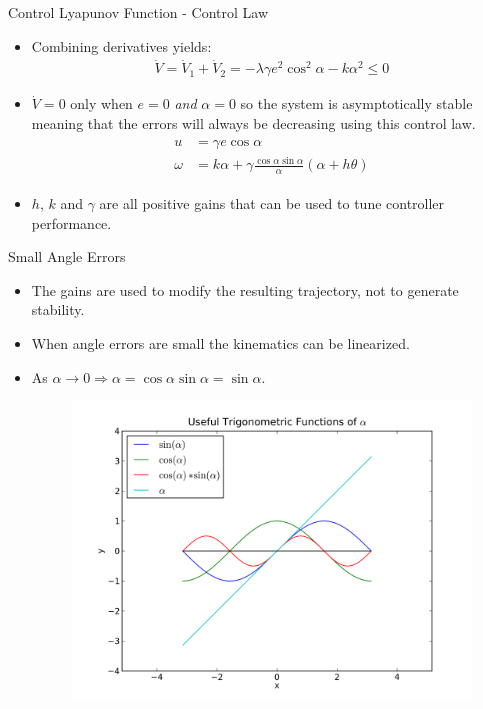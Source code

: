 \documentclass[hyperref={pdfpagelabels=false}]{beamer}
\begin{document}
\begin{frame}{Control Lyapunov Function - Control Law}
\begin{itemize}
\item Combining derivatives yields:
\begin{align*}
\dot{V} = \dot{V}_1 + \dot{V}_2 = -\lambda\gamma e^2\cos^2\alpha - k\alpha^2 \leq 0
\end{align*}
\item $\dot{V}=0$ only when $e=0$ \textit{and} $\alpha=0$ so the system is asymptotically stable meaning that the errors will always be decreasing using this control law.
\begin{align}
\label{eq:controllaw}
\begin{split}
u &= \gamma e\cos\alpha \\
\omega &= k\alpha + \gamma\frac{\cos\alpha\sin\alpha}{\alpha}\left(\alpha+h\theta\right)
\end{split}
\end{align}
\item $h$, $k$ and $\gamma$ are all positive gains that can be used to tune controller performance.
\end{itemize}
\end{frame}

\begin{frame}{Small Angle Errors}
\begin{itemize}
\item The gains are used to modify the resulting trajectory, not to generate stability.
\item When angle errors are small the kinematics can be linearized.
\item As $\alpha\to0 \Rightarrow \alpha = \cos\alpha\sin\alpha = \sin\alpha$.
\begin{figure}[ht!]
	\centering
	\includegraphics[width=.6\textwidth]{images/plotSinCos}
\end{figure}
\end{itemize}
\end{frame}
\end{document}
